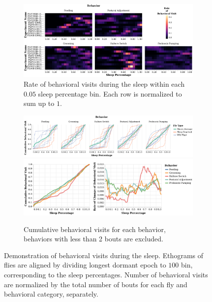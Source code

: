 \begin{figure}[ht!]
	\centering
	\begin{subfigure}[ht!]{0.975\linewidth}
		\centering\includegraphics[width=\linewidth]{figures/Heatmap_BehavioralUsage-Ann.pdf}
		\caption{Rate of behavioral visits during the sleep within each $0.05$ sleep percentage bin. Each row is normalized to sum up to $1$.}
	\end{subfigure}%

	\centering
	\begin{subfigure}[ht!]{0.975\linewidth}
		\centering\includegraphics[width=\linewidth]{figures/CumulativeLine_BehavioralUsage-Ann.pdf}
		\centering\includegraphics[width=\linewidth]{figures/MeanCumRofC_BehavioralUsage-Ann.pdf}
		\caption{Cumulative behavioral visits for each behavior, behaviors with less than 2 bouts are excluded.}
	\end{subfigure}%

	\caption[Demonstration of behavioral visits during the sleep.]{Demonstration of behavioral visits during the sleep.
		Ethograms of flies are aligned by dividing longest dormant epoch to $100$ bin, corresponding to the sleep percentages.
		Number of behavioral visits are normalized by the total number of bouts for each fly and behavioral category, separately.}

\end{figure}
